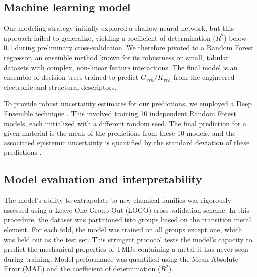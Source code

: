 \documentclass[]{article}
\begin{document}
\subsection{Machine learning model}
Our modeling strategy initially explored a shallow neural network, but this approach failed to generalize, yielding a coefficient of determination ($R^2$) below 0.1 during preliminary cross-validation. We therefore pivoted to a Random Forest regressor, an ensemble method known for its robustness on small, tabular datasets with complex, non-linear feature interactions. The final model is an ensemble of decision trees trained to predict $G_{vrh}/K_{vrh}$ from the engineered electronic and structural descriptors.

To provide robust uncertainty estimates for our predictions, we employed a Deep Ensemble technique \citep{Tavazza_2021,tavazza2021uncertainty,varivoda2022materialspropertypredictionuncertainty,jacobs2024machinelearningmaterialsproperties,Li_2024,Schreck_2024,dale2025activelearningfailsuncalibrated,korolev2022universal,sun2021datadrivendiscoveryinterpretablecausal}. This involved training 10 independent Random Forest models, each initialized with a different random seed. The final prediction for a given material is the mean of the predictions from these 10 models, and the associated epistemic uncertainty is quantified by the standard deviation of these predictions .

\subsection{Model evaluation and interpretability}
The model's ability to extrapolate to new chemical families was rigorously assessed using a Leave-One-Group-Out (LOGO) cross-validation scheme. In this procedure, the dataset was partitioned into groups based on the transition metal element. For each fold, the model was trained on all groups except one, which was held out as the test set. This stringent protocol tests the model's capacity to predict the mechanical properties of TMDs containing a metal it has never seen during training.\citep{Li_2023,Karunaratne_2025} Model performance was quantified using the Mean Absolute Error (MAE) and the coefficient of determination ($R^2$).\citep{Borg_2023}
\end{document}
